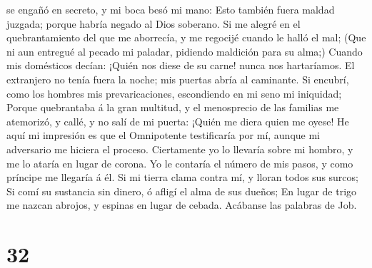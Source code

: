 se engañó en secreto, y mi boca besó mi mano:  Esto también
fuera maldad juzgada; porque habría negado al Dios soberano.
 Si me alegré en el quebrantamiento del que me aborrecía, y
me regocijé cuando le halló el mal;  (Que ni aun entregué
al pecado mi paladar, pidiendo maldición para su alma;) 
Cuando mis domésticos decían: ¡Quién nos diese de su carne! nunca nos
hartaríamos.  El extranjero no tenía fuera la noche; mis
puertas abría al caminante.  Si encubrí, como los hombres
mis prevaricaciones, escondiendo en mi seno mi iniquidad; 
Porque quebrantaba á la gran multitud, y el menosprecio de las familias
me atemorizó, y callé, y no salí de mi puerta:  ¡Quién me
diera quien me oyese! He aquí mi impresión es que el Omnipotente
testificaría por mí, aunque mi adversario me hiciera el proceso.
 Ciertamente yo lo llevaría sobre mi hombro, y me lo ataría
en lugar de corona.  Yo le contaría el número de mis pasos,
y como príncipe me llegaría á él.  Si mi tierra clama
contra mí, y lloran todos sus surcos;  Si comí su sustancia
sin dinero, ó afligí el alma de sus dueños;  En lugar de
trigo me nazcan abrojos, y espinas en lugar de cebada. Acábanse las
palabras de Job.

\hypertarget{section-31}{%
\section{32}\label{section-31}}

